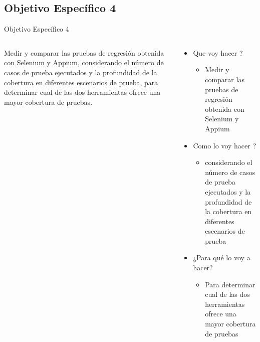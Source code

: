 \documentclass{beamer}
\begin{document}
\subsection{Objetivo Específico 4}
\begin{frame}{Objetivo Específico 4 }
  \begin{columns}
    \begin{column}{0.5\textwidth}
      Medir y comparar las pruebas de regresión obtenida con Selenium y Appium, considerando el número de casos de prueba ejecutados y la profundidad de la cobertura en diferentes escenarios de prueba, para determinar cual de las dos herramientas ofrece una mayor cobertura de pruebas. 
    \end{column}
    \begin{column}{0.5\textwidth}
      \begin{itemize}
          \item Que voy hacer ?
          \begin{itemize}
              \item  Medir y comparar las pruebas de regresión obtenida con Selenium y Appium
          \end{itemize}
          \item Como lo voy hacer ?
          \begin{itemize}
              \item considerando el número de casos de prueba ejecutados y la profundidad de la cobertura en diferentes escenarios de prueba
          \end{itemize}
         \item ¿Para qué lo voy a hacer?
         \begin{itemize}
              \item Para determinar cual de las dos herramientas ofrece una mayor cobertura de pruebas
          \end{itemize}
      \end{itemize}
    \end{column}
  \end{columns}
\end{frame}
\end{document}
